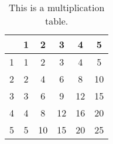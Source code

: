 \begin{table}[htbp]
    \centering
    \begin{tabular}{c||c|c|c|c|c}
          & 1 & 2 & 3 & 4 & 5 \\
        \hline\hline
        1 & 1 & 2 & 3 & 4 & 5 \\
        \hline
        2 & 2 & 4 & 6 & 8 & 10 \\
        \hline
        3 & 3 & 6 & 9 & 12 & 15 \\
        \hline
        4 & 4 & 8 & 12 & 16 & 20 \\
        \hline
        5 & 5 & 10 & 15 & 20 & 25 \\
        \hline
    \end{tabular}    
    \caption{This is a multiplication table.}
    \label{tab:multiplication}
\end{table}